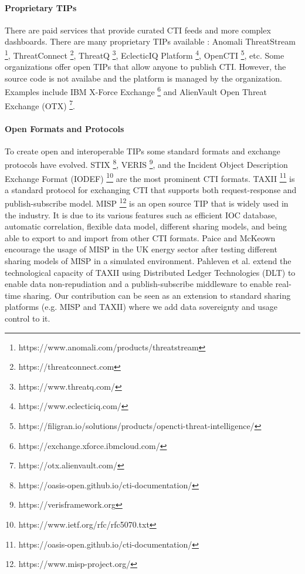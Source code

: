\documentclass{article}
\begin{document}
\paragraph{Proprietary TIPs} 
There are paid services that provide curated CTI feeds and more complex dashboards. There are many proprietary TIPs available \cite{wagner_cyber_2019}: Anomali ThreatStream \footnote{https://www.anomali.com/products/threatstream}, ThreatConnect \footnote{https://threatconnect.com}, ThreatQ \footnote{https://www.threatq.com/}, EclecticIQ Platform \footnote{https://www.eclecticiq.com/}, OpenCTI \footnote{https://filigran.io/solutions/products/opencti-threat-intelligence/}, etc. Some organizations offer open TIPs that allow anyone to publish CTI. However, the source code is not availabe and the platform is managed by the organization. Examples include IBM X-Force Exchange \footnote{https://exchange.xforce.ibmcloud.com/} and AlienVault Open Threat Exchange (OTX) \footnote{https://otx.alienvault.com/}.

\paragraph{Open Formats and Protocols}
To create open and interoperable TIPs some standard formats and exchange protocols have evolved. STIX \footnote{https://oasis-open.github.io/cti-documentation/}, VERIS \footnote{https://verisframework.org}, and the Incident Object Description Exchange Format (IODEF) \footnote{https://www.ietf.org/rfc/rfc5070.txt} are the most prominent CTI formats. TAXII \footnote{https://oasis-open.github.io/cti-documentation/} is a standard protocol for exchanging CTI that supports both request-response and publish-subscribe model. MISP \footnote{https://www.misp-project.org/} is an open source TIP that is widely used in the industry. It is due to its various features such as efficient IOC database, automatic correlation, flexible data model, different sharing models, and being able to export to and import from other CTI formats. Paice and McKeown \cite{paice_practical_2023} encourage the usage of MISP in the UK energy sector after testing different sharing models of MISP in a simulated environment.
Pahleven et al. \cite{pahlevan_secure_2021} extend the technological capacity of TAXII using Distributed Ledger Technologies (DLT) to enable data non-repudiation and a publish-subscribe middleware to enable real-time sharing.  
Our contribution can be seen as an extension to standard sharing platforms (e.g. MISP and TAXII) where we add data sovereignty and usage control to it.
\end{document}
